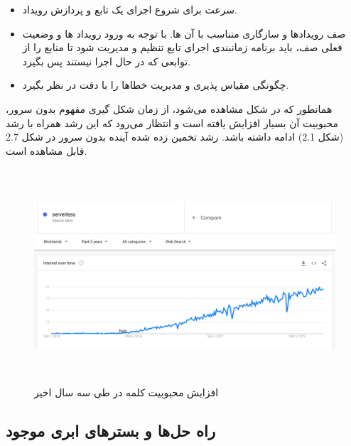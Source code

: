\begin{itemize}
	
	\item سرعت برای شروع اجرای یک تابع و پردازش رویداد.
	
	\item صف رویدادها و سازگاری متناسب با آن ها. با توجه به ورود رویداد ها و وضعیت فعلی صف، باید برنامه زمانبندی اجرای تابع تنظیم و مدیریت شود تا منابع را از توابعی که در حال اجرا نیستند پس بگیرد.
	
	\item چگونگی مقیاس پذیری و مدیریت خطاها را با دقت در نظر بگیرد.
	
\end{itemize}

همانطور که در شکل مشاهده می‌شود، از زمان شکل گیری مفهوم بدون سرور، محبوبیت آن بسیار افزایش یافته است و انتظار می‌رود که این رشد همراه با رشد  (شکل 2.1) ادامه داشته باشد. رشد تخمین زده شده آینده بدون سرور در شکل 2.7 قابل مشاهده است.

\begin{figure}[!h]
	\centering
	\includegraphics[height=8cm]{images/serverless_google_trends}
	\caption{افزایش محبوبیت کلمه  ‌‌در  طی سه سال اخیر}
	\label{تصویر 2-1}
\end{figure}

\subsection{راه حل‌ها و بسترهای ابری موجود}

